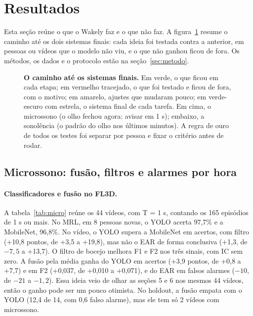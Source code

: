 \documentclass[11pt,a4paper]{article}
\newcommand{\fig}[1]{\resizebox{\textwidth}{!}{}}
\begin{document}
\section{Resultados}
\label{sec:res}

Esta seção reúne o que o Wakely faz e o que não faz. A figura~\ref{fig:jornada} resume o caminho até os dois sistemas finais: cada ideia foi testada contra a anterior, em pessoas ou vídeos que o modelo não viu, e o que não ganhou ficou de fora. Os métodos, os dados e o protocolo estão na seção~\ref{sec:metodo}.

\begin{figure}[!t]
\centering
\fig{fig_jornada.tex}
\caption{\textbf{O caminho até os sistemas finais.} Em verde, o que ficou em cada etapa; em vermelho tracejado, o que foi testado e ficou de fora, com o motivo; em amarelo, ajustes que mudaram pouco; em verde-escuro com estrela, o sistema final de cada tarefa. Em cima, o microssono (o olho fechou agora: avisar em 1 s); embaixo, a sonolência (o padrão do olho nos últimos minutos). A regra de ouro de todos os testes foi separar por pessoa e fixar o critério antes de rodar.}
\label{fig:jornada}
\end{figure}
\subsection{Microssono: fusão, filtros e alarmes por hora}
\label{sec:resA}

\paragraph{Classificadores e fusão no FL3D.} A tabela~\ref{tab:micro} reúne os 44 vídeos, com T = 1 s, contando os 165 episódios de 1 s ou mais. No MRL, em 8 pessoas novas, o YOLO acerta 97,7\% e a MobileNet, 96,8\%. No vídeo, o YOLO supera a MobileNet em acertos, com filtro (+10,8 pontos, de +3,5 a +19,8), mas não o EAR de forma conclusiva (+1,3, de $-7{,}5$ a +13,7). O filtro de bocejo melhora F1 e F2 nos três sinais, com IC sem zero. A fusão pela média ganha do YOLO em acertos (+3,9 pontos, de +0,8 a +7,7) e em F2 (+0,037, de +0,010 a +0,071), e do EAR em falsos alarmes ($-10$, de $-21$ a $-1{,}2$). Essa ideia veio de olhar as seções 5 e 6 nos mesmos 44 vídeos, então o ganho pode ser um pouco otimista. No holdout, a fusão empata com o YOLO (12,4 de 14, com 0,6 falso alarme), mas ele tem só 2 vídeos com microssono.
\end{document}
